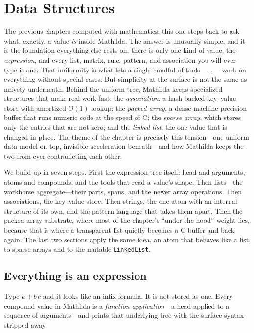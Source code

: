 \chapter{Data Structures}
\label{ch:datastructures}

The previous chapters computed with mathematics; this one steps back to ask what,
exactly, a value \emph{is} inside Mathilda. The answer is unusually simple, and it
is the foundation everything else rests on: there is only one kind of value, the
\emph{expression}, and every list, matrix, rule, pattern, and association you will
ever type is one. That uniformity is what lets a single handful of tools---,
, ---work on everything without special cases. But simplicity at
the surface is not the same as naivety underneath. Behind the uniform tree, Mathilda
keeps specialized structures that make real work fast: the \emph{association},
a hash-backed key--value store with amortized \(O(1)\) lookup; the \emph{packed
array}, a dense machine-precision buffer that runs numeric code at the speed of C;
the \emph{sparse array}, which stores only the entries that are not zero; and the
\emph{linked list}, the one value that is changed in place.
The theme of the chapter is precisely this tension---one uniform data model on top,
invisible acceleration beneath---and how Mathilda keeps the two from ever
contradicting each other.

We build up in seven steps. First the expression tree itself: head and arguments,
atoms and compounds, and the tools that read a value's shape. Then lists---the
workhorse aggregate---their parts, spans, and the newer array operations. Then
associations, the key--value store. Then strings, the one atom with an internal
structure of its own, and the pattern language that takes them apart. Then
the packed-array substrate, where
most of the chapter's ``under the hood'' weight lies, because that is where a
transparent list quietly becomes a C buffer and back again. The last two sections
apply the same idea, an atom that behaves like a list, to sparse arrays and to the
mutable \texttt{LinkedList}.

\section{Everything is an expression}
\label{sec:ds-expressions}

Type \(a + b\,c\) and it looks like an infix formula. It is not stored as one.
Every compound value in Mathilda is a \emph{function application}---a head applied to a sequence of arguments---and  prints
that underlying tree with the surface syntax stripped away.

